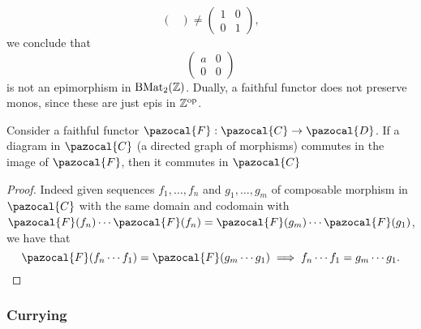 \begin{example}
$$\begin{pmatrix}
            \end{pmatrix} 
            \neq
            \begin{pmatrix}
                1 & 0\\
                0 & 1
            \end{pmatrix},
        $$
        we conclude that 
        $$
            \begin{pmatrix}
                a & 0\\
                0 & 0
            \end{pmatrix}
        $$
        is not an epimorphism in $\mathrm{B}\mathrm{Mat}_2(\mathbb{Z})$. Dually, a faithful functor does not preserve monos, since these are just epis in $\mathbb{Z}^\mathrm{op}$.
    \end{example}
    \begin{lemma}
        Consider a faithful functor $\pazocal{F}: \pazocal{C} \rightarrow \pazocal{D}$. If a diagram in $\pazocal{C}$ (a directed graph of morphisms) commutes in the image of $\pazocal{F}$, then it commutes in $\pazocal{C}$
    \end{lemma}
    \begin{proof}
        Indeed given sequences $f_1,\dots, f_n$ and $g_1,\dots,g_m$ of composable morphism in $\pazocal{C}$ with the same domain and codomain with $\pazocal{F}(f_n) \cdots \pazocal{F}(f_n) = \pazocal{F}(g_m)\cdots \pazocal{F}(g_1)$, we have that 
        $$\pazocal{F}(f_n\cdots f_1) = \pazocal{F}(g_m\cdots g_1) \implies f_n\cdots f_1 = g_m\cdots g_1.$$
    \end{proof}
\subsubsection{Currying}